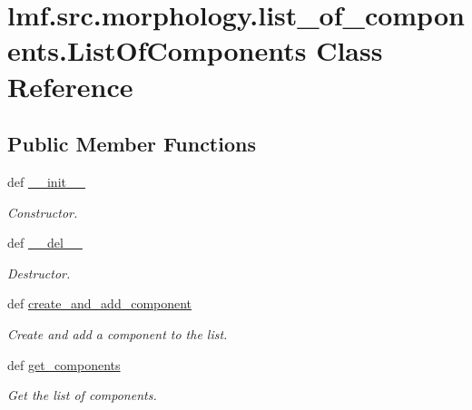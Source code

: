 \hypertarget{classlmf_1_1src_1_1morphology_1_1list__of__components_1_1_list_of_components}{\section{lmf.\+src.\+morphology.\+list\+\_\+of\+\_\+components.\+List\+Of\+Components Class Reference}
\label{classlmf_1_1src_1_1morphology_1_1list__of__components_1_1_list_of_components}
}
\subsection*{Public Member Functions}
\begin{DoxyCompactItemize}
\item 
def \hyperlink{classlmf_1_1src_1_1morphology_1_1list__of__components_1_1_list_of_components_a2f5197e9468d65a9bda951b7cee8b922}{\+\_\+\+\_\+init\+\_\+\+\_\+}
\begin{DoxyCompactList}\small\item\em Constructor. \end{DoxyCompactList}\item 
def \hyperlink{classlmf_1_1src_1_1morphology_1_1list__of__components_1_1_list_of_components_af1d3b99bc83eed991bffd96b3bbddfbc}{\+\_\+\+\_\+del\+\_\+\+\_\+}
\begin{DoxyCompactList}\small\item\em Destructor. \end{DoxyCompactList}\item 
def \hyperlink{classlmf_1_1src_1_1morphology_1_1list__of__components_1_1_list_of_components_a4004918a4618fdd29fc8008f63b47495}{create\+\_\+and\+\_\+add\+\_\+component}
\begin{DoxyCompactList}\small\item\em Create and add a component to the list. \end{DoxyCompactList}\item 
def \hyperlink{classlmf_1_1src_1_1morphology_1_1list__of__components_1_1_list_of_components_a5cb7d8774e6029c3177898d005a67049}{get\+\_\+components}
\begin{DoxyCompactList}\small\item\em Get the list of components. \end{DoxyCompactList}\end{DoxyCompactItemize}

